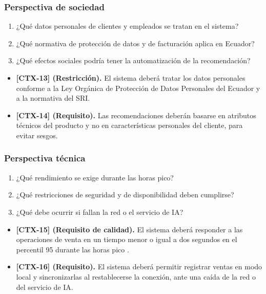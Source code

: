 \documentclass[onecolumn,12pt]{IEEEtran}
\begin{document}
\subsubsection{Perspectiva de sociedad}
\begin{enumerate}
  \item ¿Qu\'e datos personales de clientes y empleados se tratan en el sistema?
  \item ¿Qu\'e normativa de protecci\'on de datos y de facturaci\'on aplica en Ecuador?
  \item ¿Qu\'e efectos sociales podr\'ia tener la automatizaci\'on de la recomendaci\'on?
\end{enumerate}
\begin{itemize}
  \item \textbf{[CTX-13] (Restricci\'on).} El sistema deber\'a tratar los datos personales conforme a la Ley Org\'anica de Protecci\'on de Datos Personales del Ecuador y a la normativa del SRI.
  \item \textbf{[CTX-14] (Requisito).} Las recomendaciones deber\'an basarse en atributos t\'ecnicos del producto y no en caracter\'isticas personales del cliente, para evitar sesgos.
\end{itemize}

\subsubsection{Perspectiva t\'ecnica}
\begin{enumerate}
  \item ¿Qu\'e rendimiento se exige durante las horas pico?
  \item ¿Qu\'e restricciones de seguridad y de disponibilidad deben cumplirse?
  \item ¿Qu\'e debe ocurrir si fallan la red o el servicio de IA?
\end{enumerate}
\begin{itemize}
  \item \textbf{[CTX-15] (Requisito de calidad).} El sistema deber\'a responder a las operaciones de venta en un tiempo menor o igual a dos segundos en el percentil 95 durante las horas pico \cite{iso25010}.
  \item \textbf{[CTX-16] (Requisito).} El sistema deber\'a permitir registrar ventas en modo local y sincronizarlas al restablecerse la conexi\'on, ante una ca\'ida de la red o del servicio de IA.
\end{itemize}
\end{document}
